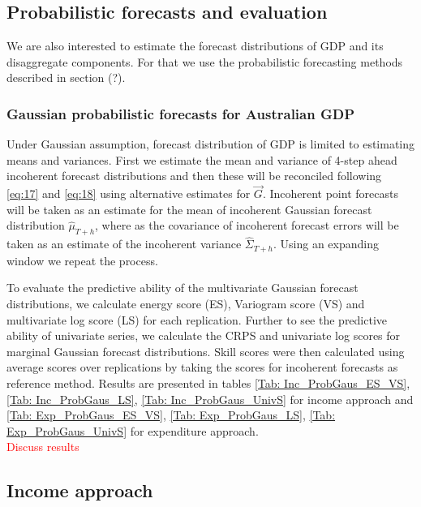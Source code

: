 \documentclass[graybox]{svmult}
\begin{document}
\subsection{Probabilistic forecasts and evaluation}

We are also interested to estimate the forecast distributions of GDP and its disaggregate components. For that we use the probabilistic forecasting methods described in section (?). 

\subsubsection{Gaussian probabilistic forecasts for Australian GDP}

Under Gaussian assumption, forecast distribution of GDP is limited to estimating means and variances. First we estimate the mean and variance of 4-step ahead incoherent forecast distributions and then these will be reconciled following \ref{eq:17} and \ref{eq:18} using alternative estimates for $\vec{G}$. Incoherent point forecasts will be taken as an estimate for the mean of incoherent Gaussian forecast distribution $\hat{\mu}_{T+h}$, where as the covariance of incoherent forecast errors will be taken as an estimate of the incoherent variance $\hat{\Sigma}_{T+h}$. Using an expanding window we repeat the process. 

To evaluate the predictive ability of the multivariate Gaussian forecast distributions, we calculate energy score (ES), Variogram score (VS) and multivariate log score (LS) for each replication. Further to see the predictive ability of univariate series, we calculate the CRPS and univariate log scores for marginal Gaussian forecast distributions. Skill scores were then calculated using average scores over replications by taking the scores for incoherent forecasts as reference method. Results are presented in tables \ref{Tab: Inc_ProbGaus_ES_VS}, \ref{Tab: Inc_ProbGaus_LS}, \ref{Tab: Inc_ProbGaus_UnivS} for income approach and \ref{Tab: Exp_ProbGaus_ES_VS}, \ref{Tab: Exp_ProbGaus_LS}, \ref{Tab: Exp_ProbGaus_UnivS} for expenditure approach. \\

\textcolor{red}{Discuss results}


\subsection*{Income approach}
\end{document}
